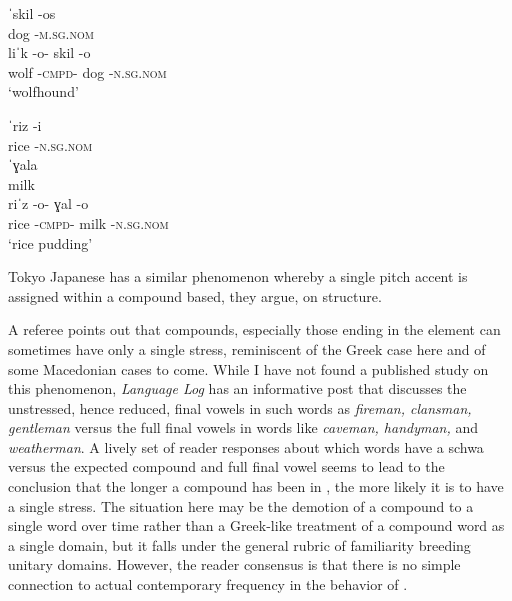\documentclass[output=paper,
modfonts
]{LSP/langsci}
\begin{document}
\begin{exe}
	\ex \label{ex:kaisse:16b} \gll ˈskil \squish-os\\
	dog \squish-\textsc{m.sg.nom} \\

	\ex \label{ex:kaisse:16c} \gll liˈk \squish-o- {\squish skil} \squish-o\\
	wolf \squish-\textsc{cmpd-} {\squish dog} \squish\textsc{-n.sg.nom}\\
	\glt ‘wolfhound’

	\ex \label{ex:kaisse:16d} \gll ˈriz \squish-i \\
	rice \squish-\textsc{n.sg.nom}\\

	\ex \label{ex:kaisse:16e} \gll ˈɣala\\
	milk \\

	\ex \label{ex:kaisse:16f} \gll riˈz \squish-o- {\squish ɣal} \squish-o\\
	rice \squish\textsc{-cmpd-} {\squish milk} \squish-\textsc{n.sg.nom} \\
	\glt  ‘rice pudding’
	\z
\z

\noindent Tokyo Japanese \citep{poser1990,kubozono2008} has a similar phenomenon whereby a single pitch accent is assigned within a compound based, they argue, on  structure. 

A referee points out that  compounds, especially those ending in the element  can sometimes have only a single stress, reminiscent of the Greek case here and of some Macedonian cases to come. While I have not found a published study on this phenomenon, \emph{Language Log} \citep{liberman2015} has an informative post that discusses the unstressed, hence reduced, final vowels in such words as \textit{fireman, clansman, gentleman} versus the full final vowels in words like \textit{caveman, handyman,} and \textit{weatherman}. A lively set of reader responses about which words have a schwa versus the expected compound  and full final vowel seems to lead to the conclusion that the longer a  compound has been in , the more likely it is to have a single stress. The situation here may be the demotion of a compound to a single word over time rather than a Greek-like treatment of a compound word as a single  domain, but it falls under the general rubric of familiarity breeding unitary  domains. However, the reader consensus is that there is no simple connection to actual contemporary frequency in the behavior of . 


\end{exe}
\end{document}
